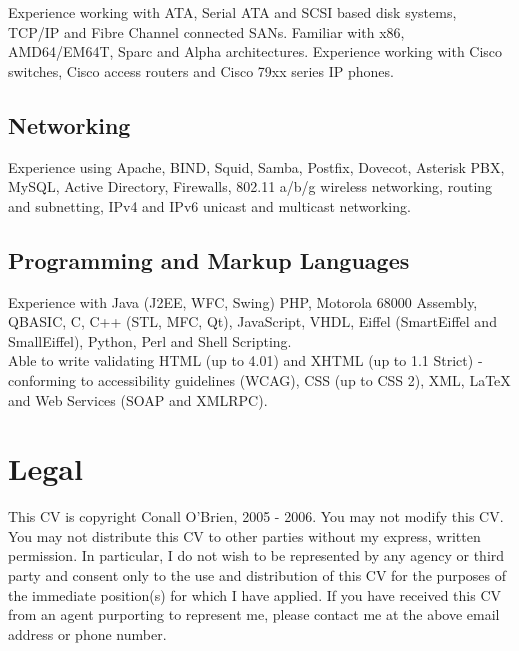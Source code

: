 \documentclass[a4paper, 11pt] {article}
\begin{document}
Experience working with ATA, Serial ATA and SCSI based disk systems, TCP/IP and 
Fibre Channel connected SANs. Familiar with x86, AMD64/EM64T, Sparc and
Alpha architectures. Experience working with Cisco switches, Cisco 
access routers and Cisco 79xx series IP phones.

\subsection*{Networking}

Experience using Apache, BIND, Squid, Samba, Postfix, Dovecot,
Asterisk PBX, MySQL, Active  Directory, Firewalls, 802.11 a/b/g wireless 
networking, routing and subnetting, IPv4 and IPv6 unicast and multicast 
networking.
 

\subsection*{Programming and Markup Languages}

Experience with Java (J2EE, WFC, Swing) PHP, Motorola 68000 Assembly, QBASIC,
C, C++ (STL, MFC, Qt), JavaScript, VHDL, Eiffel (SmartEiffel and 
SmallEiffel), Python, Perl and Shell Scripting. \\

Able to write validating HTML (up to 4.01) and XHTML (up 
to 1.1 Strict) - conforming to accessibility guidelines (WCAG), CSS (up to 
CSS 2), XML, LaTeX and Web Services (SOAP and XMLRPC).

\section*{Legal}

This CV is copyright Conall O'Brien, 2005 - 2006. You may not modify 
this CV. You may not distribute this CV to other parties without my 
express, written permission. In particular, I do not wish to be 
represented by any agency or third party and consent only to the use 
and distribution of this CV for the purposes of the immediate 
position(s) for which I have applied. If you have received this CV from 
an agent purporting to represent me, please contact me at the above 
email address or phone number.
\end{document}
